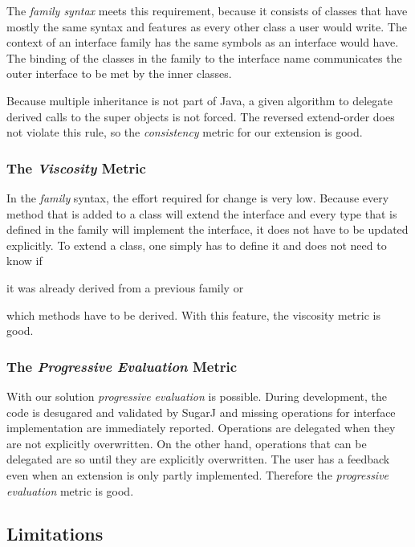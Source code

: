 \documentclass{report}
\begin{document}
The \emph{family syntax} meets this requirement, because it consists of classes that have mostly the same syntax and features as every other class a user would write. The context of an interface family has the same symbols as an interface would have. The binding of the classes in the family to the interface name communicates the outer interface to be met by the inner classes.

Because multiple inheritance is not part of Java, a given algorithm to delegate derived calls to the super objects is not forced. The reversed extend-order does not violate this rule, so the \emph{consistency} metric for our extension is good.

\subsubsection*{The \emph{Viscosity} Metric}

In the \emph{family} syntax, the effort required for change is very low. Because every method that is added to a class will extend the interface and every type that is defined in the family will implement the interface, it does not have to be updated explicitly. To extend a class, one simply has to define it and does not need to know if
\begin{inparaenum}
\item it was already derived from a previous family or \item which methods have to be derived. With this feature, the viscosity metric is good.
\end{inparaenum}

\subsubsection*{The \emph{Progressive Evaluation} Metric}

With our solution \emph{progressive evaluation} is possible. During development, the code is desugared and validated by SugarJ and missing operations for interface implementation are immediately reported. Operations are delegated when they are not explicitly overwritten. On the other hand, operations that can be delegated are so until they are explicitly overwritten. The user has a feedback even when an extension is only partly implemented. Therefore the \emph{progressive evaluation} metric is good.


\subsection{Limitations}
\label{syntaxExtensionLimitations}
\end{document}
